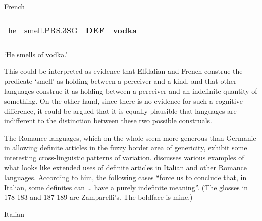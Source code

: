 \begin{listWWNumileveli}
\item {}

\begin{styleExample}
French

\end{styleExample}

\end{listWWNumileveli}

\begin{tabular}{llll}
\lsptoprule
\multicolumn{4}{l}{Il

}\\
he & smell.PRS.3SG & {\bfseries DEF} & {\bfseries vodka}\\
\lspbottomrule
\end{tabular}

\begin{styleTranslation}
‘He smells of vodka.’

\end{styleTranslation}

\begin{styleBodyTextFirst}
This could be interpreted as evidence that Elfdalian and French construe the predicate ‘smell’ as holding between a perceiver and a kind, and that other languages construe it as holding between a perceiver and an indefinite quantity of something. On the other hand, since there is no evidence for such a cognitive difference, it could be argued that it is equally plausible that languages are indifferent to the distinction between these two possible construals. 

\end{styleBodyTextFirst}

\begin{styleBodytextC}
The Romance languages, which on the whole seem more generous than Germanic in allowing definite articles in the fuzzy border area of genericity, exhibit some interesting cross-linguistic patterns of variation. \citet{Zamparelli2002} discusses various examples of what looks like extended uses of definite articles in Italian and other Romance languages. According to him, the following cases “force us to conclude that, in Italian, some definites can … have a purely indefinite meaning”. (The glosses in 178{}-183 and 187{}-189 are Zamparelli’s. The boldface is mine.)

\end{styleBodytextC}

\begin{listWWNumileveli}
\item {}

\begin{styleExample}
\label{bkm:Ref69030048}\label{bkm:Ref172696600}Italian

\end{styleExample}

\end{listWWNumileveli}

